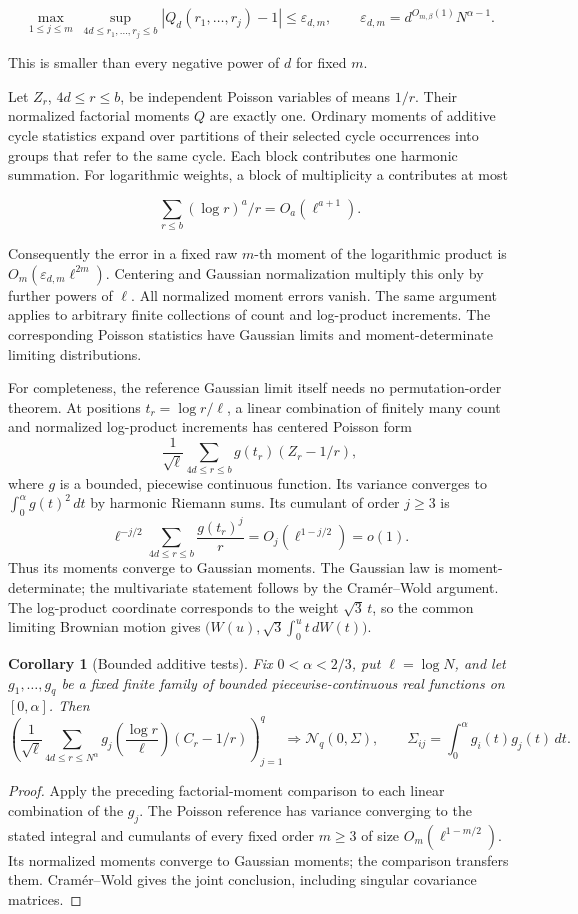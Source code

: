 \documentclass[11pt]{article}
\newtheorem{corollary}[theorem]{Corollary}
\theoremstyle{remark}
\begin{document}
\[
 \max_{1\le j\le m}\ \sup_{4d\le r_1,\ldots,r_j\le b}
 |Q_d(r_1,\ldots,r_j)-1|
 \le \varepsilon_{d,m},\qquad
 \varepsilon_{d,m}=d^{O_{m,\beta}(1)}N^{\alpha-1}.
 \tag{8.1}\label{eq:8.1}
\]

This is smaller than every negative power of \(d\) for fixed \(m\).

Let \(Z_r\), \(4d\le r\le b\), be independent Poisson variables of means
\(1/r\). Their normalized factorial moments \(Q\) are exactly one.
Ordinary moments of additive cycle statistics expand over partitions of
their selected cycle occurrences into groups that refer to the same
cycle. Each block contributes one harmonic summation. For logarithmic
weights, a block of multiplicity a contributes at most

\[
 \sum_{r\le b}(\log r)^a/r=O_a(\ell^{a+1}).
\]

Consequently the error in a fixed raw \(m\)-th moment of the logarithmic
product is \(O_m(\varepsilon_{d,m}\ell^{2m})\). Centering and Gaussian
normalization multiply this only by further powers of \(\ell\). All
normalized moment errors vanish. The same argument applies to arbitrary
finite collections of count and log-product increments. The
corresponding Poisson statistics have Gaussian limits and
moment-determinate limiting distributions.

For completeness, the reference Gaussian limit itself needs no
permutation-order theorem. At positions \(t_r=\log r/\ell\), a linear
combination of finitely many count and normalized log-product increments
has centered Poisson form \[
 \frac1{\sqrt\ell}\sum_{4d\le r\le b}
        g(t_r)(Z_r-1/r),
\] where \(g\) is a bounded, piecewise continuous function. Its variance
converges to \(\int_0^\alpha g(t)^2\,dt\) by harmonic Riemann sums. Its
cumulant of order \(j\ge3\) is \[
 \ell^{-j/2}\sum_{4d\le r\le b}\frac{g(t_r)^j}{r}
 =O_j(\ell^{1-j/2})=o(1).
\] Thus its moments converge to Gaussian moments. The Gaussian law is
moment-determinate; the multivariate statement follows by the
Cramér--Wold argument. The log-product coordinate corresponds to the
weight \(\sqrt3\,t\), so the common limiting Brownian motion gives
\(\bigl(W(u),\sqrt3\int_0^u t\,dW(t)\bigr)\).

\begin{corollary}[Bounded additive tests]\label{cor:additive}
Fix $0<\alpha<2/3$, put $\ell=\log N$, and let
$g_1,\ldots,g_q$ be a fixed finite family of bounded piecewise-continuous
real functions on $[0,\alpha]$. Then
\[
 \left(
 \frac1{\sqrt\ell}\sum_{4d\le r\le N^\alpha}
 g_j\!\left(\frac{\log r}{\ell}\right)(C_r-1/r)
 \right)_{j=1}^q
 \Longrightarrow \mathcal N_q(0,\Sigma),
 \qquad
 \Sigma_{ij}=\int_0^\alpha g_i(t)g_j(t)\,dt.
\]
\end{corollary}
\begin{proof}
Apply the preceding factorial-moment comparison to each linear combination
of the $g_j$. The Poisson reference has variance converging to the stated
integral and cumulants of every fixed order $m\ge3$ of size
$O_m(\ell^{1-m/2})$. Its normalized moments converge to Gaussian moments;
the comparison transfers them. Cram\'{e}r--Wold gives the joint conclusion,
including singular covariance matrices.
\end{proof}
\end{document}
